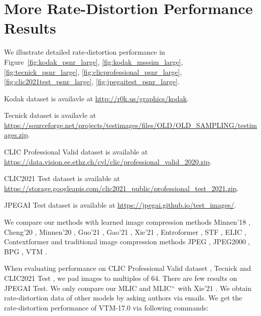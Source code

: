 \documentclass[sigconf]{acmart}
\begin{document}
\section{More Rate-Distortion Performance Results}
We illustrate detailed rate-distortion performance in Figure~\ref{fig:kodak_psnr_large}, \ref{fig:kodak_msssim_large},
 \ref{fig:tecnick_psnr_large}, \ref{fig:clicprofessional_psnr_large}, \ref{fig:clic2021test_psnr_large}, \ref{fig:jpegaitest_psnr_large}.\par
Kodak dataset is availavle at \url{http://r0k.us/graphics/kodak}.\par Tecnick dataset is availavle at \url{https://sourceforge.net/projects/testimages/files/OLD/OLD_SAMPLING/testimages.zip}.\par
CLIC Professional Valid dataset is available at \url{https://data.vision.ee.ethz.ch/cvl/clic/professional_valid_2020.zip}.\par
CLIC2021 Test dataset is available at \url{https://storage.googleapis.com/clic2021_public/professional_test_2021.zip}.\par
JPEGAI Test dataset is available at \url{https://jpegai.github.io/test_images/}.\par
We compare our methods with learned image compression methods Minnen'18 \cite{DBLP:conf/nips/MinnenBT18}, Cheng'20 \cite{DBLP:conf/cvpr/ChengSTK20}, Minnen'20 \cite{DBLP:conf/icip/MinnenS20}, Guo'21 \cite{ DBLP:journals/tcsv/GuoZFC22}, Gao'21 \cite{DBLP:conf/iccv/GaoYPHZDL21}, Xie'21 \cite{DBLP:conf/mm/XieCC21}, Entroformer \cite{DBLP:journals/corr/abs-2202-05492}, STF \cite{DBLP:journals/corr/abs-2203-08450},
ELIC \cite{He_2022_CVPR}, Contextformer \cite{koyuncu2022contextformer} and traditional image compression methods JPEG \cite{JPEG-ITU1992Information}, JPEG2000 \cite{DBLP:conf/icmcs/CharrierCL99}, BPG \cite{bpg}, VTM \cite{vtm2019}. \par
When evaluating performance on CLIC Professional Valid dataset \cite{clic2020dataset}, Tecnick \cite{asuni2014testimages} and CLIC2021 Test \cite{clic2020dataset}, we pad images to multiples of $64$.
There are few results on JPEGAI Test. We only compare our MLIC and MLIC$^+$ with Xie'21 \cite{DBLP:conf/mm/XieCC21}.
We obtain rate-distortion data of other models by asking authors via emails.
We get the rate-distortion performance of VTM-17.0 \cite{vtm2019} via following commands:
\end{document}
